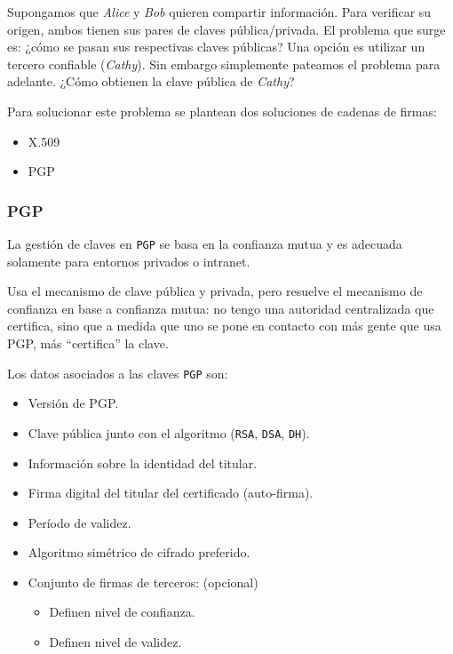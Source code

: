 Supongamos que \emph{Alice} y \emph{Bob} quieren compartir información. Para verificar su origen, ambos tienen sus pares de claves pública/privada. El problema que surge es: ¿cómo se pasan sus respectivas claves públicas? Una opción es utilizar un tercero confiable (\emph{Cathy}). Sin embargo simplemente pateamos el problema para adelante. ¿Cómo obtienen la clave pública de \emph{Cathy}? 

Para solucionar este problema se plantean dos soluciones de cadenas de firmas:
\begin{itemize}
	\item X.509
	\item PGP
\end{itemize}


\subsubsection{PGP}
La gestión de claves en \texttt{PGP} se basa en la confianza mutua y es adecuada solamente para entornos privados o intranet.

Usa el mecanismo de clave pública y privada, pero resuelve el mecanismo de confianza en base a confianza mutua: no tengo una autoridad centralizada que certifica, sino que a medida que uno se pone en contacto con más gente que usa PGP, más ``certifica'' la clave.

Los datos asociados a las claves \texttt{PGP} son:
\begin{itemize}
	\item Versión de PGP.
	\item Clave pública junto con el algoritmo (\texttt{RSA}, \texttt{DSA}, \texttt{DH}).
	\item Información sobre la identidad del titular.
	\item Firma digital del titular del certificado (auto-firma).
	\item Período de validez.
	\item Algoritmo simétrico de cifrado preferido.
	\item Conjunto de firmas de terceros: (opcional)
	\begin{itemize}
		\item Definen nivel de confianza.
		\item Definen nivel de validez.
	\end{itemize}
\end{itemize}


